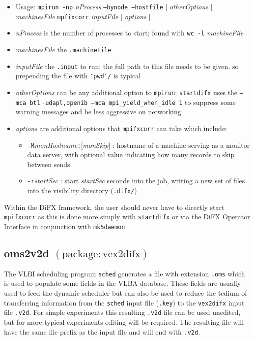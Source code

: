 \begin{itemize}
\item[] Usage: {\tt mpirun -np} {\em nProcess} {\tt --bynode --hostfile} $[$ {\em otherOptions} $]$ {\em machinesFile} {\tt mpfixcorr} {\em inputFile} $[$ {\em options} $]$
\item[] {\em nProcess} is the number of processes to start; found with {\tt wc -l} {\em machineFile}
\item[] {\em machinesFile} the {\tt .machineFile}
\item[] {\em inputFile} the {\tt .input} to run; the full path to this file needs to be given, so prepending the file with {\tt `pwd`/} is typical
\item[] {\em otherOptions} can be any additional option to {\tt mpirun}; {\tt startdifx} uses the {\tt --mca btl $\hat{\ }$udapl,openib --mca mpi\_yield\_when\_idle 1} to suppress some warning messages and be less aggressive on networking
\item[] {\em options} are additional options that {\tt mpifxcorr} can take which include:
\begin{itemize}
\item[] {\tt -M}{\em monHostname}{\tt :}$[${\em monSkip}$]$ : hostname of a machine serving as a monitor data server, with optional value indicating how many records to skip between sends.
\item[] {\tt -r}{\em startSec} : start {\em startSec} seconds into the job, writing a new set of files into the visibility directory ({\tt .difx/})
\end{itemize}
\end{itemize}

Within the DiFX framework, the user should never have to directly start {\tt mpifxcorr} as this is done more simply with {\tt startdifx} or via the DiFX Operator Interface in conjunction with {\tt mk5daemon}.









\subsection{oms2v2d {\small $\mathrm{(package: vex2difx)}$} \label{sec:oms2v2d}}

The VLBI scheduling program {\tt sched} generates a file with extension {\tt .oms} which is used to populate some fields in the VLBA database.
These fields are usually used to feed the dynamic scheduler but can also be used to reduce the tedium of transferring information from the {\tt sched} input file ({\tt .key}) to the {\tt vex2difx} input file {\tt .v2d}.
For simple experiments this resulting {\tt .v2d} file can be used unedited, but for more typical experiments editing will be required.
The resulting file will have the same file prefix as the input file and will end with {\tt .v2d}.

